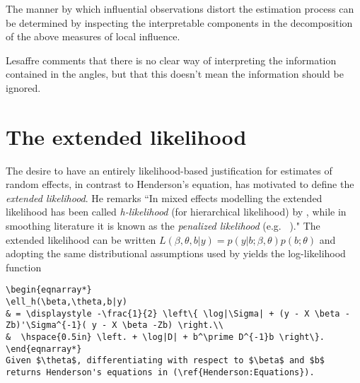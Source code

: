\documentclass[MAIN.tex]{subfiles}
\begin{document}
The manner by which influential observations
distort the estimation process can be determined by inspecting the
interpretable components in the decomposition of the above
measures of local influence.


Lesaffre comments that there is no clear way of interpreting the
information contained in the angles, but that this doesn't mean
the information should be ignored.










\section{The extended likelihood}

The desire to have an entirely likelihood-based justification for estimates of random effects, in contrast to Henderson's equation, has motivated \citet[page 429]{Pawi:in:2001} to define the \emph{extended likelihood}. He remarks ``In mixed effects modelling the extended likelihood has been called \emph{h-likelihood} (for hierarchical  likelihood) by \cite{Lee:Neld:hier:1996}, while in smoothing literature it is known as the \emph{penalized likelihood} (e.g.\ \citeauthor{Gree:Silv:nonp:1994} \citeyear{Gree:Silv:nonp:1994})." The extended likelihood can be written $L(\beta,\theta,b|y) = p(y|b;\beta,\theta) p(b;\theta)$ and adopting the same distributional assumptions used by \cite{Henderson:1950} yields the log-likelihood function
\begin{verbatim}
\begin{eqnarray*}
\ell_h(\beta,\theta,b|y)
& = \displaystyle -\frac{1}{2} \left\{ \log|\Sigma| + (y - X \beta -Zb)'\Sigma^{-1}( y - X \beta -Zb) \right.\\
&  \hspace{0.5in} \left. + \log|D| + b^\prime D^{-1}b \right\}.
\end{eqnarray*}
Given $\theta$, differentiating with respect to $\beta$ and $b$ returns Henderson's equations in (\ref{Henderson:Equations}).
\end{verbatim}
\end{document}
